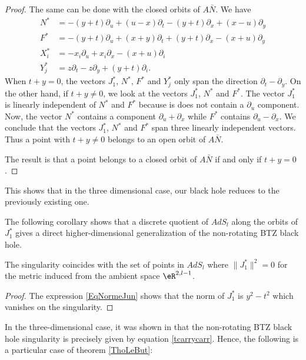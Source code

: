 \begin{proof}
The same can be done with the closed orbits of $A\bar{N}$. We have
\begin{subequations}
\begin{align}
	N^*	&=	-(y+t)\partial_u+(u-x)\partial_t-(y+t)\partial_x+(x-u)\partial_y\\
	F^*	&=	-(y+t)\partial_u+(x+y)\partial_t+(y+t)\partial_x-(x+u)\partial_y\\
	X^*_i	&=	-x_i\partial_u+x_i\partial_x-(x+u)\partial_i\\
	Y_j^*	&=	z\partial_t-z\partial_y+(y+t)\partial_i.
\end{align}
\end{subequations}
When $t+y=0$, the vectors $J_1^*$, $N^*$, $F^*$ and $Y_j^*$ only span the direction $\partial_t-\partial_y$. On the other hand, if $t+y\neq 0$, we look at the vectors $J_1^*$, $N^*$ and $F^*$. The vector $J_1^*$ is linearly independent of $N^*$ and $F^*$ because is does not contain a $\partial_u$ component. Now, the vector $N^*$ contains a component $\partial_u+\partial_x$ while $F^*$ contains $\partial_u-\partial_x$. We conclude that the vectors $J_1^*$, $N^*$ and $F^*$ span three linearly independent vectors. Thus a point with $t+y\neq 0$ belongs to an open orbit of $A\bar N$.

The result is that a point belongs to a closed orbit of $A\bar{N}$ if and only if $t+y=0$.
\end{proof}
This shows that in the three dimensional case, our black hole reduces to the previously existing one. 

The following corollary shows that a discrete quotient of $AdS_l$ along the orbits of $J_1^*$ gives a direct higher-dimensional generalization of the non-rotating BTZ black hole.
\begin{corollary}
The singularity coincides with the set of points in $AdS_l$ where $\| J_1^* \|^2 = 0$ for the metric induced from the ambient space $\eR^{2,l-1}$.
\label{CorJannsingul}
\end{corollary}

\begin{proof}
The expression \eqref{EqNormeJun} shows that the norm of $J_1^* $ is $y^2-t^2$ which vanishes on the singularity.
\end{proof}

In the three-dimensional case, it was shown in \cite{BTZ_deux,BTZB_un} that the non-rotating BTZ black hole singularity is precisely given by equation \eqref{tcarrycarr}. Hence, the following is a particular case of theorem \ref{ThoLeBut}:

